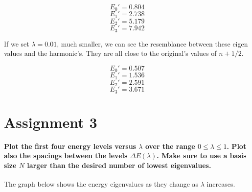 \documentclass[12pt]{article}
\begin{document}
\begin{equation}
E_0' = 0.804    
\end{equation}
\begin{equation}
E_1' =    2.738
\end{equation}
\begin{equation}
E_2' =      5.179    
\end{equation}
\begin{equation}
E_3' =       7.942
\end{equation}

If we set $\lambda = 0.01$, much smaller, we can see the resemblance between these eigen values and the harmonic's. They are all close to the original's values of $n+1/2$.        

\begin{equation}
E_0' = 0.507    
\end{equation}
\begin{equation}
E_1' =   1.536
\end{equation}
\begin{equation}
E_2' =       2.591    
\end{equation}
\begin{equation}
E_3' =        3.671
\end{equation}



\section{Assignment 3}

\paragraph{Plot the first four energy levels versus $\lambda$ over the range $0 \leq  \lambda \leq 1$. Plot also the spacings between the levels $\Delta E(\lambda)$. Make sure to use a basis size $N$ larger than the desired number of lowest eigenvalues.} 

The graph below shows the energy eigenvalues as they change as $\lambda$ increases.
\end{document}
